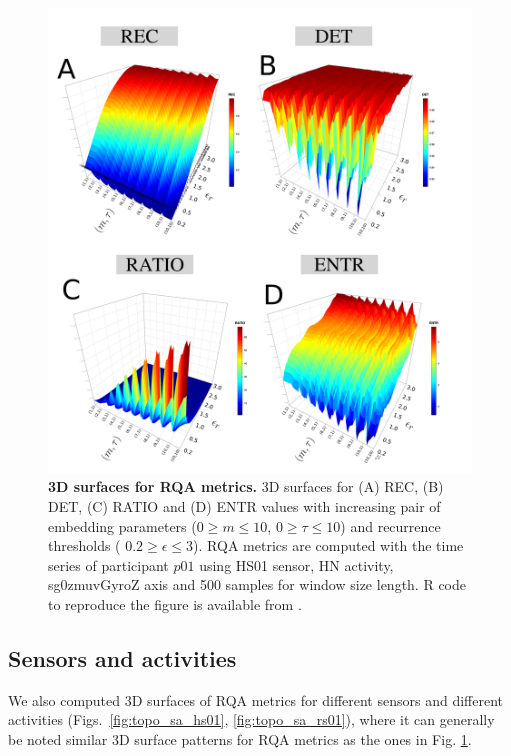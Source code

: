 \begin{figure}[!ht]
\centering
\includegraphics[width=1.0\textwidth]{rqas}
    \caption{
	{\bf 3D surfaces for RQA metrics.}
	3D surfaces for (A) REC, (B) DET, (C) RATIO and (D) ENTR values 
	with increasing pair of embedding parameters 
	($0 \ge m \le 10$, $0 \ge \tau \le 10$) 
	and recurrence thresholds (  $ 0.2 \ge \epsilon \le 3 $).
	RQA metrics are computed with the time series of participant $p01$ using 
	HS01 sensor, HN activity, sg0zmuvGyroZ axis and 500 samples 
	for window size length.
        R code to reproduce the figure is available from \cite{hwum2018}.
	}
\label{fig:topo_rqas}
\end{figure}


\subsection{Sensors and activities}
We also computed 3D surfaces of RQA metrics for different sensors 
and different activities 
(Figs.~\ref{fig:topo_sa_hs01}, \ref{fig:topo_sa_rs01}), where it can 
generally be noted similar 3D surface patterns for RQA metrics as the ones
in Fig. \ref{fig:topo_rqas}. 

